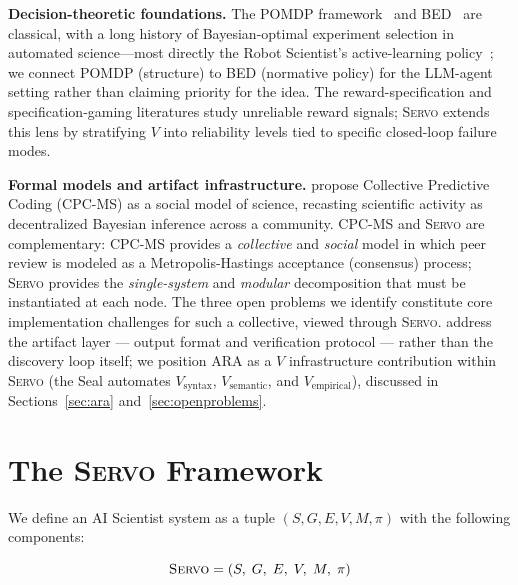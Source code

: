 \documentclass{article}
\newcommand{\sgmvpi}{$(S, G, E, V, M, \pi)$}
\newcommand{\framework}{\textsc{Servo}}
\begin{document}
\textbf{Decision-theoretic foundations.} The POMDP framework~\citep{kaelbling1998pomdp} and BED~\citep{chaloner1995bayesian,rainforth2024modern} are classical, with a long history of Bayesian-optimal experiment selection in automated science---most directly the Robot Scientist's active-learning policy~\citep{king2004robot}; we connect POMDP (structure) to BED (normative policy) for the LLM-agent setting rather than claiming priority for the idea. The reward-specification and specification-gaming literatures study unreliable reward signals; \framework{} extends this lens by stratifying $V$ into reliability levels tied to specific closed-loop failure modes.

\textbf{Formal models and artifact infrastructure.} \citet{taniguchi2024cpc} propose Collective Predictive Coding (CPC-MS) as a social model of science, recasting scientific activity as decentralized Bayesian inference across a community. CPC-MS and \framework{} are complementary: CPC-MS provides a \emph{collective} and \emph{social} model in which peer review is modeled as a Metropolis-Hastings acceptance (consensus) process; \framework{} provides the \emph{single-system} and \emph{modular} decomposition that must be instantiated at each node. The three open problems we identify constitute core implementation challenges for such a collective, viewed through \framework{}. \citet{liu2026lasthuman} address the artifact layer --- output format and verification protocol --- rather than the discovery loop itself; we position ARA as a $V$ infrastructure contribution within \framework{} (the Seal automates $V_\text{syntax}$, $V_\text{semantic}$, and $V_\text{empirical}$), discussed in Sections~\ref{sec:ara} and~\ref{sec:openproblems}.

\section{The \framework{} Framework}
\label{sec:framework}

We define an AI Scientist system as a tuple \sgmvpi{} with the following components:

\begin{equation}
  \text{\framework{}} = (S,\; G,\; E,\; V,\; M,\; \pi)
\end{equation}
\end{document}
